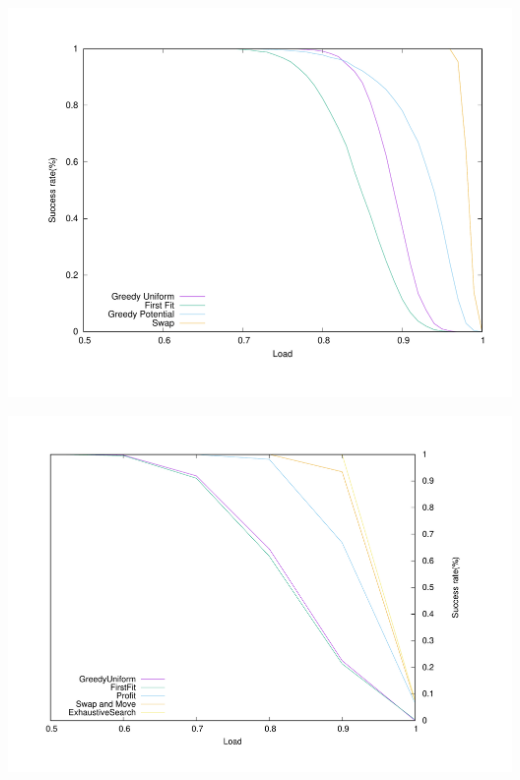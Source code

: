 \documentclass[a4paper,cleveref, autoref, thm-restate,UKenglish]{lipics-v2019}
\begin{document}
\hspace{-2cm}
\begin{minipage}[c]{.49\linewidth} 
\begin{center}
\includegraphics[scale=0.275]{success_tau1}
\end{center}
\label{fig:tau1}
\end{minipage}
\begin{minipage}[c]{.45\linewidth} 
\vspace{0.1cm}
\begin{center}
\includegraphics[scale=0.275]{tau110}
\end{center}
\label{fig:tau1-10mess}
\end{minipage}
\end{document}
